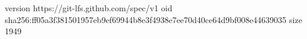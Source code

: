 version https://git-lfs.github.com/spec/v1
oid sha256:ff05a3f381501957eb9ef69944b8e3f4938e7ee70d40ce64d9bf008e44639035
size 1949
